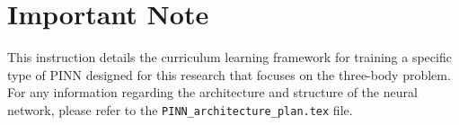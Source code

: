 \section{Important Note}
This instruction details the curriculum learning framework for training a specific type of PINN 
designed for this research that focuses on the three-body problem. 
For any information regarding the architecture and structure of the neural network, 
please refer to the \texttt{PINN\_architecture\_plan.tex} file.

